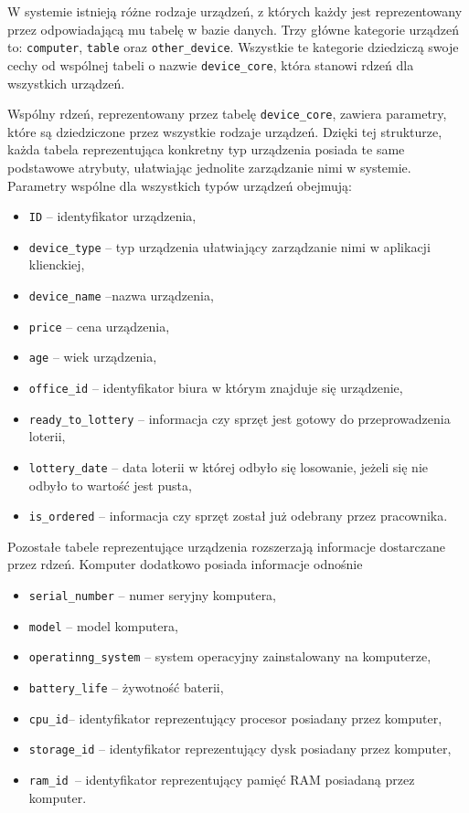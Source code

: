 W systemie istnieją różne rodzaje urządzeń, z których każdy jest reprezentowany przez odpowiadającą mu tabelę w bazie danych. Trzy główne kategorie urządzeń to: \texttt{computer}, \texttt{table} oraz \texttt{other\_device}. Wszystkie te kategorie dziedziczą swoje cechy od wspólnej tabeli o nazwie \texttt{device\_core}, która stanowi rdzeń dla wszystkich urządzeń.

Wspólny rdzeń, reprezentowany przez tabelę \texttt{device\_core}, zawiera parametry, które są dziedziczone przez wszystkie rodzaje urządzeń. Dzięki tej strukturze, każda tabela reprezentująca konkretny typ urządzenia posiada te same podstawowe atrybuty, ułatwiając jednolite zarządzanie nimi w systemie. Parametry wspólne dla wszystkich typów urządzeń obejmują: 
\begin{itemize}
	\item \texttt{ID} -- identyfikator urządzenia,
	\item \texttt{device\_type} -- typ urządzenia ułatwiający zarządzanie nimi w aplikacji klienckiej,
	\item \texttt{device\_name} --nazwa urządzenia,
	\item \texttt{price} -- cena urządzenia,
	\item \texttt{age} -- wiek urządzenia,
	\item \texttt{office\_id} -- identyfikator biura w którym znajduje się urządzenie,
	\item \texttt{ready\_to\_lottery} -- informacja czy sprzęt jest gotowy do przeprowadzenia loterii,
	\item \texttt{lottery\_date} -- data loterii w której odbyło się losowanie, jeżeli się nie odbyło to wartość jest pusta,
	\item \texttt{is\_ordered} -- informacja czy sprzęt został już odebrany przez pracownika.
\end{itemize}

Pozostałe tabele reprezentujące urządzenia rozszerzają informacje dostarczane przez rdzeń. Komputer dodatkowo posiada informacje odnośnie
\begin{itemize}
	\item \texttt{serial\_number} -- numer seryjny komputera,
	\item \texttt{model} -- model komputera,
	\item \texttt{operatinng\_system} -- system operacyjny zainstalowany na komputerze,
	\item \texttt{battery\_life} -- żywotność baterii,
	\item \texttt{cpu\_id}-- identyfikator reprezentujący procesor posiadany przez komputer,
	\item \texttt{storage\_id} -- identyfikator reprezentujący dysk posiadany przez komputer,
	\item \texttt{ram\_id }-- identyfikator reprezentujący pamięć RAM posiadaną przez komputer.
\end{itemize}


